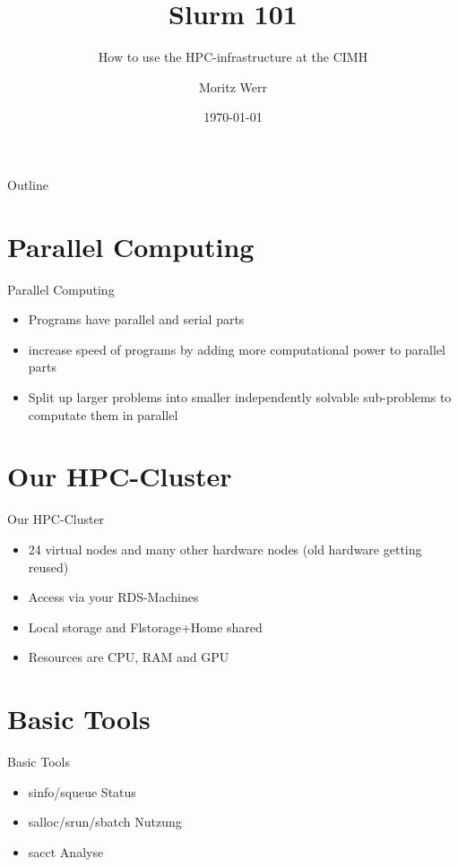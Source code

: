 \documentclass{beamer}
\title{Slurm 101}
\subtitle{How to use the HPC-infrastructure at the CIMH}
\author{Moritz Werr}
\institute{Research IT}
\date{\today}
\begin{document}
\begin{frame}
    \titlepage
\end{frame}

\begin{frame}{Outline}
    \tableofcontents
\end{frame}

\section{Parallel Computing}
\begin{frame}{Parallel Computing}
    \begin{itemize}
        \item Programs have parallel and serial parts
        \item increase speed of programs by adding more computational power to parallel parts
        \item Split up larger problems into smaller independently solvable sub-problems to computate them in parallel
    \end{itemize}
\end{frame}

\section{Our HPC-Cluster}
\begin{frame}{Our HPC-Cluster}
	
	    \begin{itemize}
		\item 24 virtual nodes and many other hardware nodes (old hardware getting reused)
		\item Access via your RDS-Machines
		\item Local storage and Flstorage+Home shared
		\item Resources are CPU, RAM and GPU
	\end{itemize}

\end{frame}

\section{Basic Tools}
\begin{frame}{Basic Tools}
    \begin{itemize}
        \item sinfo/squeue Status
        \item salloc/srun/sbatch Nutzung
        \item sacct Analyse
    \end{itemize}
\end{frame}
\end{document}
